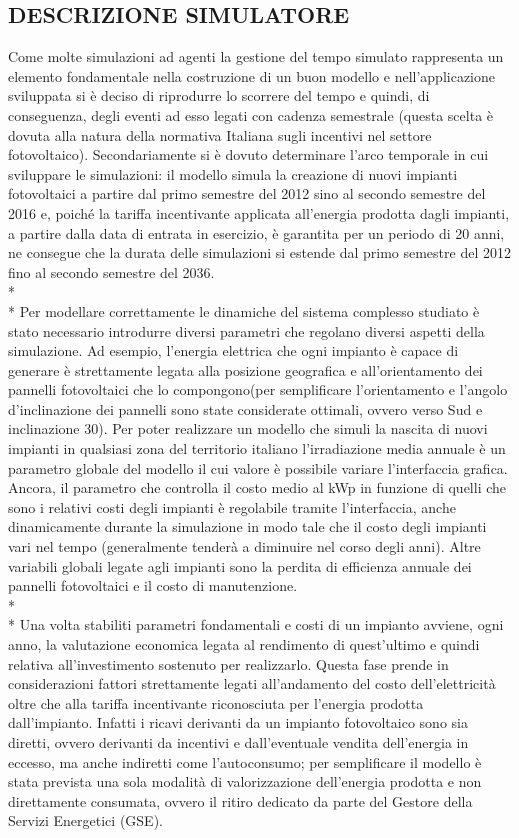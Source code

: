 \documentclass[12pt,a4paper,openright,twoside]{report}
\begin{document}
\subsection{DESCRIZIONE SIMULATORE}
Come molte simulazioni ad agenti la gestione del tempo simulato rappresenta un elemento fondamentale nella costruzione di un buon modello e nell'applicazione sviluppata si è deciso di riprodurre lo scorrere del tempo e quindi, di conseguenza, degli eventi ad esso legati con cadenza semestrale (questa scelta è dovuta alla natura della normativa Italiana sugli incentivi nel settore fotovoltaico). Secondariamente si è dovuto determinare l'arco temporale in cui sviluppare le simulazioni: il modello simula la creazione di nuovi impianti fotovoltaici a partire dal primo semestre del 2012 sino al secondo semestre del 2016 e, poiché la tariffa incentivante applicata all'energia prodotta dagli impianti, a partire dalla data di entrata in esercizio, è garantita per un periodo di 20 anni, ne consegue che la durata delle simulazioni si estende dal primo semestre del 2012 fino al secondo semestre del 2036.
\\* \\*
Per modellare correttamente le dinamiche del sistema complesso studiato è stato necessario introdurre diversi parametri che regolano diversi aspetti della simulazione. Ad esempio, l'energia elettrica che ogni impianto è capace di generare è strettamente legata alla posizione geografica e all'orientamento dei pannelli fotovoltaici che lo compongono(per semplificare l'orientamento e l'angolo d'inclinazione dei pannelli sono state considerate ottimali, ovvero verso Sud e inclinazione 30\textdegree). Per poter realizzare un modello che simuli la nascita di nuovi impianti in qualsiasi zona del territorio italiano l'irradiazione media annuale è un parametro globale del modello il cui valore è possibile variare l'interfaccia grafica. Ancora, il parametro che controlla il costo medio al kWp in funzione di quelli che sono i relativi costi degli impianti è regolabile tramite l'interfaccia, anche dinamicamente durante la simulazione in modo tale che il costo degli impianti vari nel tempo (generalmente tenderà a diminuire nel corso degli anni). Altre variabili globali legate agli impianti sono la perdita di efficienza annuale dei pannelli fotovoltaici e il costo di manutenzione.
\\* \\*
Una volta stabiliti parametri fondamentali e costi di un impianto avviene, ogni anno, la valutazione economica legata al rendimento di quest'ultimo e quindi relativa all'investimento sostenuto per realizzarlo. Questa fase prende in considerazioni fattori strettamente legati all'andamento del costo dell'elettricità oltre che alla tariffa incentivante riconosciuta per l'energia prodotta dall'impianto. Infatti i ricavi derivanti da un impianto fotovoltaico sono sia diretti, ovvero derivanti da incentivi e dall'eventuale vendita dell'energia in eccesso, ma anche indiretti come l'autoconsumo; per semplificare il modello è stata prevista una sola modalità di valorizzazione dell'energia prodotta e non direttamente consumata, ovvero il ritiro dedicato da parte del Gestore della Servizi Energetici (GSE).
\end{document}
